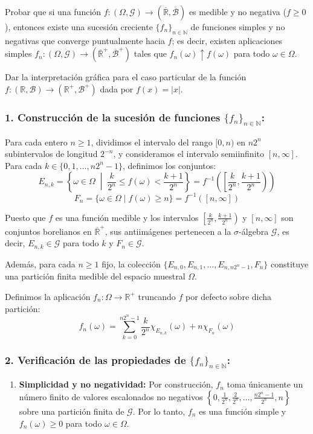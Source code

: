 \newpage
\begin{problema}
Probar que si una función $f : (\Omega, \mathcal{G}) \to (\overline{\mathbb{R}}, \overline{\mathcal{B}})$ es medible y no negativa ($f \ge 0$), entonces existe una sucesión creciente $\{f_n\}_{n \in \mathbb{N}}$ de funciones simples y no negativas que converge puntualmente hacia $f$; es decir, existen aplicaciones simples $f_n : (\Omega, \mathcal{G}) \to (\overline{\mathbb{R}}^+, \overline{\mathcal{B}}^+)$ tales que $f_n(\omega) \uparrow f(\omega)$ para todo $\omega \in \Omega$.

Dar la interpretación gráfica para el caso particular de la función $f : (\mathbb{R}, \mathcal{B}) \to (\mathbb{R}^+, \mathcal{B}^+)$ dada por $f(x) = |x|$.

\tcblower

\subsubsection*{1. Construcción de la sucesión de funciones $\{f_n\}_{n \in \mathbb{N}}$:}
Para cada entero $n \ge 1$, dividimos el intervalo del rango $[0, n)$ en $n 2^n$ subintervalos de longitud $2^{-n}$, y consideramos el intervalo semiinfinito $[n, \infty]$. Para cada $k \in \{0, 1, \dots, n 2^n - 1\}$, definimos los conjuntos:
\[
    E_{n,k} = \left\{ \omega \in \Omega \;\middle|\; \frac{k}{2^n} \le f(\omega) < \frac{k+1}{2^n} \right\} = f^{-1}\left( \left[ \frac{k}{2^n}, \frac{k+1}{2^n} \right) \right)
\]
\[
    F_n = \{ \omega \in \Omega \mid f(\omega) \ge n \} = f^{-1}([n, \infty])
\]

Puesto que $f$ es una función medible y los intervalos $\left[ \frac{k}{2^n}, \frac{k+1}{2^n} \right)$ y $[n, \infty]$ son conjuntos borelianos en $\overline{\mathbb{R}}^+$, sus antiimágenes pertenecen a la $\sigma$-álgebra $\mathcal{G}$, es decir, $E_{n,k} \in \mathcal{G}$ para todo $k$ y $F_n \in \mathcal{G}$.

Además, para cada $n \ge 1$ fijo, la colección $\{E_{n,0}, E_{n,1}, \dots, E_{n,n2^n-1}, F_n\}$ constituye una partición finita medible del espacio muestral $\Omega$.

Definimos la aplicación $f_n : \Omega \to \mathbb{R}^+$ truncando $f$ por defecto sobre dicha partición:
\[
    f_n(\omega) = \sum_{k=0}^{n 2^n - 1} \frac{k}{2^n} \chi_{E_{n,k}}(\omega) + n \chi_{F_n}(\omega)
\]

\subsubsection*{2. Verificación de las propiedades de $\{f_n\}_{n \in \mathbb{N}}$:}
\begin{enumerate}[label=\alph*)]
    \item \textbf{Simplicidad y no negatividad:} Por construcción, $f_n$ toma únicamente un número finito de valores escalonados no negativos $\left\{0, \frac{1}{2^n}, \frac{2}{2^n}, \dots, \frac{n 2^n - 1}{2^n}, n\right\}$ sobre una partición finita de $\mathcal{G}$. Por lo tanto, $f_n$ es una función simple y $f_n(\omega) \ge 0$ para todo $\omega \in \Omega$.


\end{enumerate}
\end{problema}

